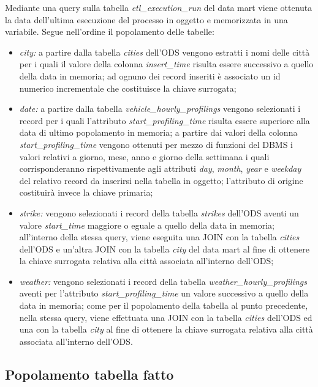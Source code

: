 Mediante una query sulla tabella \textit{etl\_execution\_run} del data mart
viene ottenuta la data dell'ultima esecuzione del processo in oggetto e
memorizzata in una variabile. Segue nell'ordine il popolamento delle tabelle:
\begin{itemize}
\item \textit{city:} a partire dalla tabella \textit{cities} dell'ODS vengono
estratti i nomi delle città per i quali il valore della colonna
\textit{insert\_time} risulta essere successivo a quello 
della data in memoria; ad ognuno dei record inseriti è associato un id
numerico incrementale che costituisce la chiave surrogata;
\item \textit{date:} a partire dalla tabella \textit{vehicle\_hourly\_profilings}
vengono selezionati i record per i quali l'attributo
\textit{start\_profiling\_time} risulta essere superiore alla data di ultimo
popolamento in memoria; a partire dai valori della colonna
\textit{start\_profiling\_time} vengono ottenuti per mezzo di funzioni del DBMS
i valori relativi a giorno, mese, anno e giorno della settimana i quali
corrisponderanno rispettivamente agli attributi \textit{day}, \textit{month},
\textit{year} e \textit{weekday} del relativo record da inserirsi nella tabella
in oggetto; l'attributo di origine costituirà invece la chiave primaria;
\item \textit{strike:} vengono selezionati i record della tabella \textit{strikes}
dell'ODS aventi un valore \textit{start\_time} maggiore o eguale a quello della
data in memoria; all'interno della stessa query, viene eseguita una JOIN con la
tabella \textit{cities} dell'ODS e un'altra JOIN con la tabella \textit{city}
del data mart al fine di ottenere la chiave surrogata relativa alla città
associata all'interno dell'ODS;
\item \textit{weather:} vengono selezionati i record della tabella
\textit{weather\_hourly\_profilings} aventi per l'attributo
\textit{start\_profiling\_time} un valore successivo a quello della data in memoria;
come per il popolamento della tabella al punto precedente, nella stessa query,
viene effettuata una JOIN con la tabella \textit{cities} dell'ODS ed una con la
tabella \textit{city} al fine di ottenere la chiave surrogata relativa alla città
associata all'interno dell'ODS.
\end{itemize}

\subsection{Popolamento tabella fatto}

